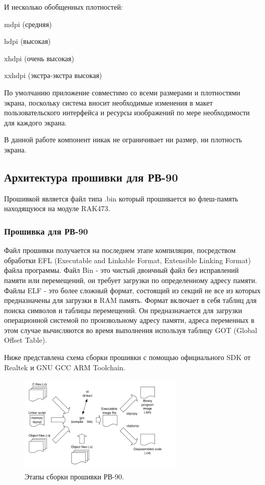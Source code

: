 И несколько обобщенных плотностей: 
\begin{my_enumerate}
\item mdpi (средняя)
\item hdpi (высокая)
\item xhdpi (очень высокая)
\item xxhdpi (экстра-экстра высокая)
\end{my_enumerate}

По умолчанию приложение совместимо со всеми размерами и плотностями экрана, поскольку система вносит необходимые изменения в макет пользовательского интерфейса и ресурсы изображений по мере необходимости для каждого экрана.

В данной работе компонент никак не ограничивает ни размер, ни плотность экрана.






\newpage
\subsection{Архитектура прошивки для РВ-90}
Прошивкой является файл типа .bin который прошивается во флеш-память находящуюся на модуле RAK473.




\subsubsection{ Прошивка для РВ-90 }
Файл прошивки получается на последнем этапе компиляции, посредством обработки EFL (Executable and Linkable Format, Extensible Linking Format) файла программы. 
Файл Bin - это чистый двоичный файл без исправлений памяти или перемещений, он требует загрузки по определенному адресу памяти.
Файлы ELF - это более сложный формат, состоящий из секций не все из которых предназначены для загрузки в RAM память. Формат включает в себя таблиц для поиска символов и таблицы перемещений. Он предназначается для загрузки операционной системой по произвольному адресу памяти, адреса переменных в этом случае вычисляются во время выполнения используя таблицу GOT (Global Offset Table). 

Ниже представлена схема сборки прошивки с помощью официального SDK от Realtek и GNU GCC ARM Toolchain.
 
\begin{figure}[h!]
    \centering
    \includegraphics[width=0.7\textwidth]{compilation_steps_firmware.png}
    \caption{Этапы сборки прошивки РВ-90.}
\end{figure}
 


